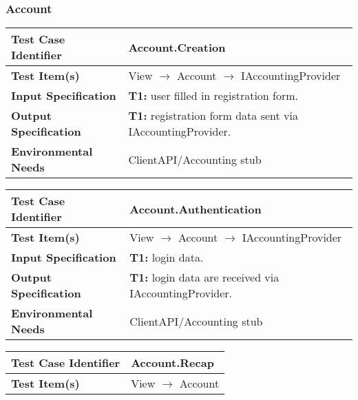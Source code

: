 {\subsubsection{Account}
\noindent
\begin{tabularx}{\textwidth}{l X}
    \hline 
    \textbf{Test Case Identifier} & Account.Creation\\ 
    \hline 
    
    \textbf{Test Item(s)} & View $\rightarrow$ Account $\rightarrow$ IAccountingProvider\\
    \hline 
    
    \textbf{Input Specification}  & \textbf{T1:} user filled in registration form.\\
    \hline 
    
    \textbf{Output Specification} & \textbf{T1:} registration form data sent via IAccountingProvider.\\
    \hline 
    
    \textbf{Environmental Needs} & ClientAPI/Accounting stub\\
    \hline
\end{tabularx}
\bigskip 

\noindent
\begin{tabularx}{\textwidth}{l X}
    \hline 
    \textbf{Test Case Identifier} & Account.Authentication\\ 
    \hline 
    
    \textbf{Test Item(s)} & View $\rightarrow$ Account $\rightarrow$ IAccountingProvider\\
    \hline 
    
    \textbf{Input Specification} & \textbf{T1:} login data.\\
    \hline 
    
    \textbf{Output Specification} & \textbf{T1:} login data are received via IAccountingProvider.\\
    \hline 
    
    \textbf{Environmental Needs} & ClientAPI/Accounting stub\\
    \hline
\end{tabularx}
\bigskip 

\noindent
\begin{tabularx}{\textwidth}{l X}
    \hline 
    \textbf{Test Case Identifier} & Account.Recap\\
    \hline 
    
    \textbf{Test Item(s)} & View $\rightarrow$ Account\\
    \hline 
    

\end{tabularx}}
